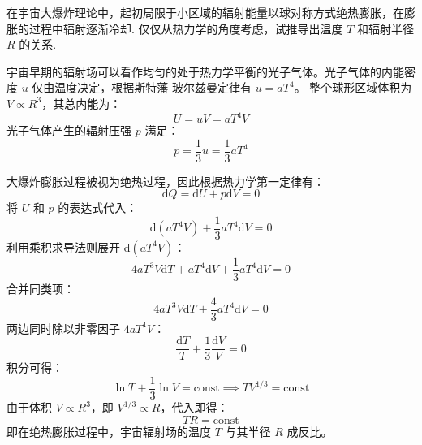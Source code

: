 \begin{exercise}\label{ex:11.7}
在宇宙大爆炸理论中，起初局限于小区域的辐射能量以球对称方式绝热膨胀，在膨胀的过程中辐射逐渐冷却. 仅仅从热力学的角度考虑，试推导出温度 $T$ 和辐射半径 $R$ 的关系.
\end{exercise}
\begin{solution}
宇宙早期的辐射场可以看作均匀的处于热力学平衡的光子气体。光子气体的内能密度 $u$ 仅由温度决定，根据斯特藩-玻尔兹曼定律有 $u = aT^4$。
整个球形区域体积为 $V \propto R^3$，其总内能为：
$$ U = u V = a T^4 V $$
光子气体产生的辐射压强 $p$ 满足：
$$ p = \frac{1}{3} u = \frac{1}{3} a T^4 $$

大爆炸膨胀过程被视为绝热过程，因此根据热力学第一定律有：
$$ \mathrm{d}Q = \mathrm{d}U + p \mathrm{d}V = 0 $$
将 $U$ 和 $p$ 的表达式代入：
$$ \mathrm{d}(a T^4 V) + \frac{1}{3} a T^4 \mathrm{d}V = 0 $$
利用乘积求导法则展开 $\mathrm{d}(a T^4 V)$：
$$ 4a T^3 V \mathrm{d}T + a T^4 \mathrm{d}V + \frac{1}{3} a T^4 \mathrm{d}V = 0 $$
合并同类项：
$$ 4a T^3 V \mathrm{d}T + \frac{4}{3} a T^4 \mathrm{d}V = 0 $$
两边同时除以非零因子 $4a T^4 V$：
$$ \frac{\mathrm{d}T}{T} + \frac{1}{3} \frac{\mathrm{d}V}{V} = 0 $$
积分可得：
$$ \ln T + \frac{1}{3} \ln V = \mathrm{const} \implies T V^{1/3} = \mathrm{const} $$
由于体积 $V \propto R^3$，即 $V^{1/3} \propto R$，代入即得：
$$ T R = \mathrm{const} $$
即在绝热膨胀过程中，宇宙辐射场的温度 $T$ 与其半径 $R$ 成反比。
\end{solution}

